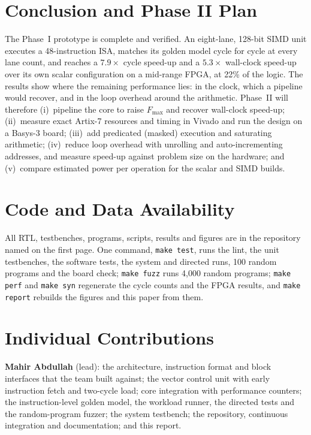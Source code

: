 \documentclass[journal]{IEEEtran}
\newcommand{\x}{\ensuremath{\times}}
\begin{document}
\section{Conclusion and Phase II Plan}\label{sec:conclusion}
The Phase~I prototype is complete and verified. An eight-lane, 128-bit SIMD unit
executes a 48-instruction ISA, matches its golden model cycle for cycle at every lane
count, and reaches a $7.9\x$ cycle speed-up and a $5.3\x$ wall-clock speed-up over its
own scalar configuration on a mid-range FPGA, at 22\% of the logic. The results show
where the remaining performance lies: in the clock, which a pipeline would recover, and
in the loop overhead around the arithmetic. Phase~II will therefore
(i)~pipeline the core to raise $F_{\max}$ and recover wall-clock speed-up;
(ii)~measure exact Artix-7 resources and timing in Vivado and run the design on a
Basys-3 board;
(iii)~add predicated (masked) execution and saturating arithmetic;
(iv)~reduce loop overhead with unrolling and auto-incrementing addresses, and measure
speed-up against problem size on the hardware; and
(v)~compare estimated power per operation for the scalar and SIMD builds.

\section*{Code and Data Availability}
All RTL, testbenches, programs, scripts, results and figures are in the repository
named on the first page. One command,
\texttt{make test}, runs the lint, the unit testbenches, the software tests, the system
and directed runs, 100 random programs and the board check; \texttt{make fuzz} runs
4,000 random programs; \texttt{make perf} and \texttt{make syn} regenerate the cycle
counts and the FPGA results, and \texttt{make report} rebuilds the figures and this
paper from them. 

\section*{Individual Contributions}
\textbf{Mahir Abdullah} (lead): the architecture, instruction format and block interfaces
that the team built against; the vector control unit with early instruction fetch and
two-cycle load; core integration with performance counters; the instruction-level golden
model, the workload runner, the directed tests and the random-program fuzzer; the
system testbench; the repository,
continuous integration and documentation; and this report.
\end{document}
